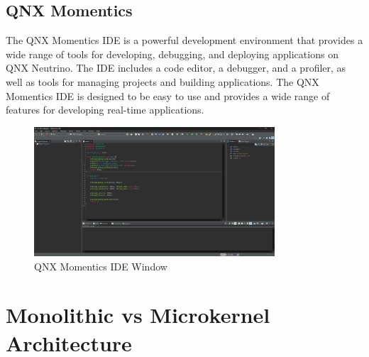 \documentclass{article}
\begin{document}
\subsection{QNX Momentics}
\label{sec:qnx-momentics}
The QNX Momentics IDE is a powerful development environment that provides a wide range of tools for developing, debugging, and deploying applications on QNX Neutrino.
The IDE includes a code editor, a debugger, and a profiler, as well as tools for managing projects and building applications.
The QNX Momentics IDE is designed to be easy to use and provides a wide range of features for developing real-time applications.
 
\begin{figure}[!htbp]
    \centering
    \includegraphics[width=0.8\textwidth]{graph2.png} %
    \caption{QNX Momentics IDE Window \citep{qnx_m} }
    \label{fig:qnx-momentics window}
\end{figure}

\section{Monolithic vs Microkernel Architecture}
\label{sec:monolithic-vs-microkernel}
\end{document}
